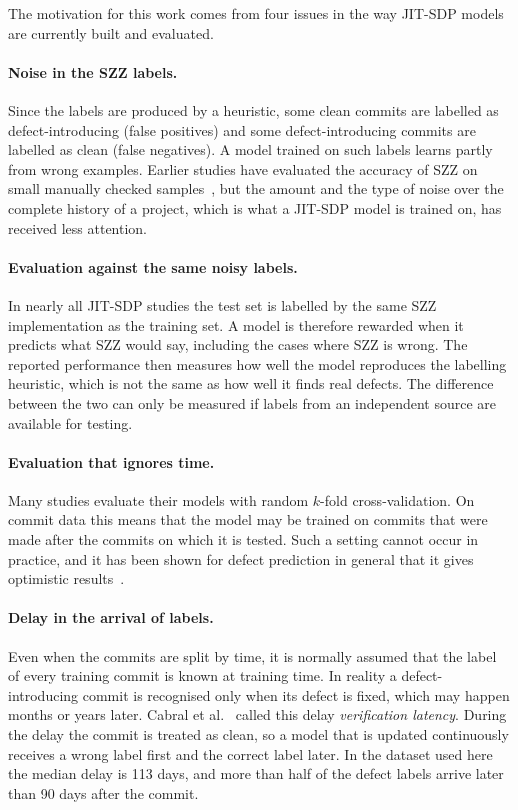 \documentclass[12pt,a4paper,oneside]{report}
\begin{document}
The motivation for this work comes from four issues in the way JIT-SDP models
are currently built and evaluated.

\paragraph{Noise in the SZZ labels.} Since the labels are produced by a
heuristic, some clean commits are labelled as defect-introducing (false
positives) and some defect-introducing commits are labelled as clean (false
negatives). A model trained on such labels learns partly from wrong examples.
Earlier studies have evaluated the accuracy of SZZ on small manually checked
samples~\cite{dacosta2017maszz,rosa2021oracle}, but the amount and the
type of noise over the complete history of a project, which is what a JIT-SDP
model is trained on, has received less attention.

\paragraph{Evaluation against the same noisy labels.} In nearly all JIT-SDP
studies the test set is labelled by the same SZZ implementation as the
training set. A model is therefore rewarded when it predicts what SZZ would
say, including the cases where SZZ is wrong. The reported performance then
measures how well the model reproduces the labelling heuristic, which is not
the same as how well it finds real defects. The difference between the two can
only be measured if labels from an independent source are available for
testing.

\paragraph{Evaluation that ignores time.} Many studies evaluate their models
with random $k$-fold cross-validation. On commit data this means that the
model may be trained on commits that were made after the commits on which it
is tested. Such a setting cannot occur in practice, and it has been shown for
defect prediction in general that it gives optimistic
results~\cite{falessi2020order,tan2015online}.

\paragraph{Delay in the arrival of labels.} Even when the commits are split
by time, it is normally assumed that the label of every training commit is
known at training time. In reality a defect-introducing commit is recognised
only when its defect is fixed, which may happen months or years later. Cabral
et al.~\cite{cabral2019orb} called this delay \emph{verification latency}.
During the delay the commit is treated as clean, so a model that is updated
continuously receives a wrong label first and the correct label later. In the
dataset used here the median delay is 113 days, and more than half of the
defect labels arrive later than 90 days after the commit.
\end{document}
